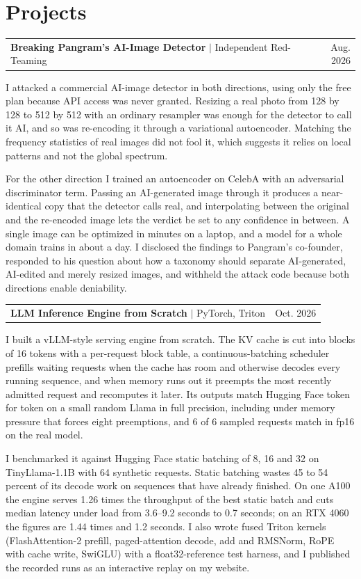 \documentclass[letterpaper,10pt]{article}
\makeatletter
\newif\ifafterhead
\newcommand{\cvProject}[2]{%
  \par\ifafterhead\vspace{5.2pt}\else\vspace{5pt}\fi\global\afterheadfalse\hspace*{0.15in}%
  \begin{tabular*}{0.97\textwidth}{l@{\extracolsep{\fill}}r}
    #1 & #2 \\
  \end{tabular*}\par\nopagebreak\vspace{0pt}\nopagebreak}
\makeatother
\begin{document}
\section{Projects}
\cvProject{\textbf{Breaking Pangram's AI-Image Detector} $|$ \small{Independent Red-Teaming}}{Aug. 2026}
\begin{cvBody}
I attacked a commercial AI-image detector in both directions, using only the free plan because API access was never granted. Resizing a real photo from 128 by 128 to 512 by 512 with an ordinary resampler was enough for the detector to call it AI, and so was re-encoding it through a variational autoencoder. Matching the frequency statistics of real images did not fool it, which suggests it relies on local patterns and not the global spectrum.

For the other direction I trained an autoencoder on CelebA with an adversarial discriminator term. Passing an AI-generated image through it produces a near-identical copy that the detector calls real, and interpolating between the original and the re-encoded image lets the verdict be set to any confidence in between. A single image can be optimized in minutes on a laptop, and a model for a whole domain trains in about a day. I disclosed the findings to Pangram's co-founder, responded to his question about how a taxonomy should separate AI-generated, AI-edited and merely resized images, and withheld the attack code because both directions enable deniability.
\end{cvBody}

\cvProject{\textbf{LLM Inference Engine from Scratch} $|$ \small{PyTorch, Triton}}{Oct. 2026}
\begin{cvBody}
I built a vLLM-style serving engine from scratch. The KV cache is cut into blocks of 16 tokens with a per-request block table, a continuous-batching scheduler prefills waiting requests when the cache has room and otherwise decodes every running sequence, and when memory runs out it preempts the most recently admitted request and recomputes it later. Its outputs match Hugging Face token for token on a small random Llama in full precision, including under memory pressure that forces eight preemptions, and 6 of 6 sampled requests match in fp16 on the real model.

I benchmarked it against Hugging Face static batching of 8, 16 and 32 on TinyLlama-1.1B with 64 synthetic requests. Static batching wastes 45 to 54 percent of its decode work on sequences that have already finished. On one A100 the engine serves 1.26 times the throughput of the best static batch and cuts median latency under load from 3.6--9.2 seconds to 0.7 seconds; on an RTX 4060 the figures are 1.44 times and 1.2 seconds. I also wrote fused Triton kernels (FlashAttention-2 prefill, paged-attention decode, add and RMSNorm, RoPE with cache write, SwiGLU) with a float32-reference test harness, and I published the recorded runs as an interactive replay on my website.
\end{cvBody}
\end{document}
